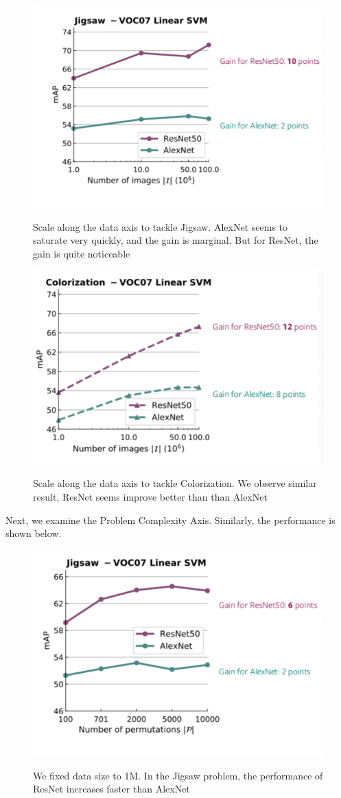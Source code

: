 \begin{figure}[H]
\centering
\includegraphics[width=0.8\linewidth]{figs/jigsaw1.png}
\label{fig:jigsaw1}
\caption{Scale along the data axis to tackle Jigsaw. AlexNet seems to saturate very quickly, and the gain is marginal. But for ResNet, the gain is quite noticeable}
\end{figure}


\begin{figure}[H]
\centering
\includegraphics[width=0.8\linewidth]{figs/colorization1.png}
\label{fig:colorization1}
\caption{Scale along the data axis to tackle Colorization. We observe similar result, ResNet seems improve better than than AlexNet}
\end{figure}

Next, we examine the Problem Complexity Axis. Similarly, the performance is shown below.

\begin{figure}[H]
\centering
\includegraphics[width=0.8\linewidth]{figs/jigsaw2.png}
\label{fig:jigsaw2}
\caption{We fixed data size to 1M. In the Jigsaw problem, the performance of ResNet increases faster than AlexNet}
\end{figure}


